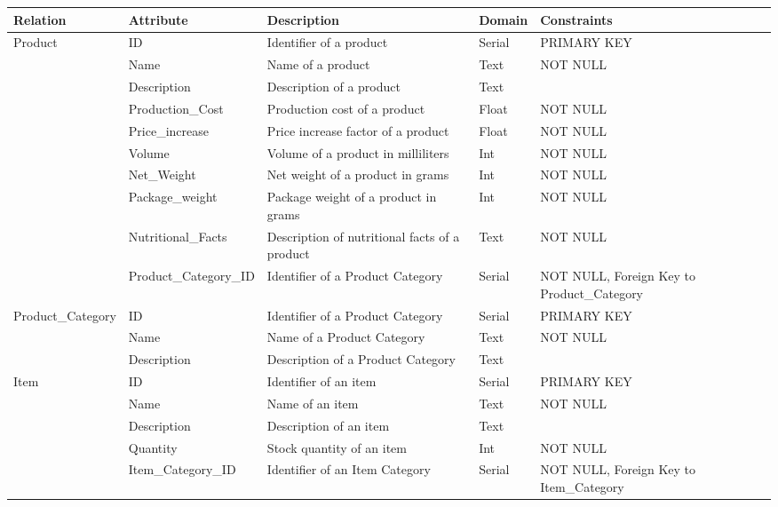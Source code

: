 \begin{longtable}{|p{}|p{} |p{}|p{}|p{} |} 
\hline
\textbf{Relation} & \textbf{Attribute} & \textbf{Description} & \textbf{Domain} & \textbf{Constraints} \\\hline

\multirow{10}{*}{Product} & ID & Identifier of a product & Serial &  PRIMARY KEY\\\cline{2-5}
& Name & Name of a product & Text & NOT NULL \\\cline{2-5}
& Description & Description of a product  & Text &  \\\cline{2-5}
& Production\_Cost & Production cost of a product & Float & NOT NULL \\\cline{2-5}
& Price\_increase & Price increase factor of a product & Float & NOT NULL \\\cline{2-5}
& Volume & Volume of a product in milliliters  & Int & NOT NULL \\\cline{2-5}
& Net\_Weight & Net weight of a product in grams & Int & NOT NULL \\\cline{2-5}
& Package\_weight & Package weight of a product in grams & Int  & NOT NULL \\\cline{2-5}
& Nutritional\_Facts & Description of nutritional facts of a product & Text & NOT NULL \\\cline{2-5}
& Product\_Category\_ID & Identifier of a Product Category & Serial  & NOT NULL, Foreign Key to Product\_Category \\\hline

\multirow{3}{*}{Product\_Category} & ID & Identifier of a Product Category & Serial & PRIMARY KEY \\\cline{2-5}
& Name & Name of a Product Category & Text & NOT NULL \\\cline{2-5}
& Description & Description of a Product Category & Text & \\\hline

\multirow{5}{*}{Item} & ID & Identifier of an item  & Serial & PRIMARY KEY \\\cline{2-5}
& Name & Name of an item & Text & NOT NULL\\\cline{2-5}
& Description & Description of an item & Text & \\\cline{2-5}
& Quantity & Stock quantity of an item & Int & NOT NULL \\\cline{2-5}
& Item\_Category\_ID & Identifier of an Item Category & Serial  & NOT NULL, Foreign Key to Item\_Category\\\hline


\end{longtable}
